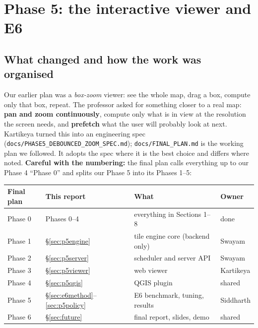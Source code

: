 ﻿\documentclass[11pt,a4paper]{article}
\newcommand{\code}[1]{\texttt{#1}}
\begin{document}
\section{Phase 5: the interactive viewer and E6}\label{sec:phase5}
\subsection{What changed and how the work was organised}
Our earlier plan was a \emph{box-zoom} viewer: see the whole map, drag a box, compute only that box, repeat. The
professor asked for something closer to a real map: \textbf{pan and zoom continuously}, compute only what is in view at
the resolution the screen needs, and \textbf{prefetch} what the user will probably look at next. Kartikeya turned this
into an engineering spec (\code{docs/PHASE5\_DEBOUNCED\_ZOOM\_SPEC.md}); \code{docs/FINAL\_PLAN.md} is the working plan we
followed. It adopts the spec where it is the best choice and differs where noted. \textbf{Careful with the numbering:} the
final plan calls everything up to our Phase 4 ``Phase 0'' and splits our Phase 5 into its Phases 1--5:
\begin{center}\small
\begin{tabularx}{\linewidth}{>{\raggedright\arraybackslash}p{3.3cm}>{\raggedright\arraybackslash}p{3.2cm}L>{\raggedright\arraybackslash}p{2.3cm}}
\toprule
Final plan & This report & What & Owner \\
\midrule
Phase 0 & Phases 0--4 & everything in Sections 1--8 & done \\
Phase 1 & \S\ref{sec:p5engine} & tile engine core (backend only) & Swayam \\
Phase 2 & \S\ref{sec:p5server} & scheduler and server API & Swayam \\
Phase 3 & \S\ref{sec:p5viewer} & web viewer & Kartikeya \\
Phase 4 & \S\ref{sec:p5qgis} & QGIS plugin & shared \\
Phase 5 & \S\ref{sec:e6method}--\ref{sec:p5policy} & E6 benchmark, tuning, results & Siddharth \\
Phase 6 & \S\ref{sec:future} & final report, slides, demo & shared \\
\bottomrule
\end{tabularx}
\end{center}
\end{document}
